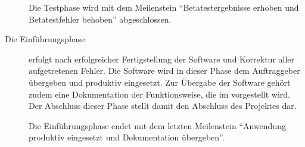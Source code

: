 \begin{description}
  Die Testphase wird mit dem Meilenstein "`Betatestergebnisse erhoben und
  Betatestfehler behoben"' abgeschlossen.

  \item[Die Einführungsphase] erfolgt nach erfolgreicher Fertigstellung der Software und Korrektur aller
  aufgetretenen Fehler. Die Software wird in dieser Phase dem Auftraggeber übergeben und produktiv eingesetzt.
  Zur Übergabe der Software gehört zudem eine Dokumentation der Funktionsweise, die im  vorgestellt wird. Der Abschluss dieser Phase stellt damit den Abschluss des Projektes dar.

  Die Einführungsphase endet mit dem letzten Meilenstein "`Anwendung produktiv
  eingesetzt und Dokumentation übergeben"'.

\end{description}